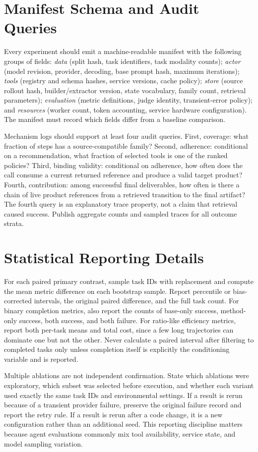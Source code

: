 \documentclass[10pt]{article}
\begin{document}
\section{Manifest Schema and Audit Queries}
Every experiment should emit a machine-readable manifest with the following groups of fields: \emph{data} (split hash, task identifiers, task modality counts); \emph{actor} (model revision, provider, decoding, base prompt hash, maximum iterations); \emph{tools} (registry and schema hashes, service versions, cache policy); \emph{store} (source rollout hash, builder/extractor version, state vocabulary, family count, retrieval parameters); \emph{evaluation} (metric definitions, judge identity, transient-error policy); and \emph{resources} (worker count, token accounting, service hardware configuration). The manifest must record which fields differ from a baseline comparison.

Mechanism logs should support at least four audit queries. First, coverage: what fraction of steps has a source-compatible family? Second, adherence: conditional on a recommendation, what fraction of selected tools is one of the ranked policies? Third, binding validity: conditional on adherence, how often does the call consume a current returned reference and produce a valid target product? Fourth, contribution: among successful final deliverables, how often is there a chain of live product references from a retrieved transition to the final artifact? The fourth query is an explanatory trace property, not a claim that retrieval caused success. Publish aggregate counts and sampled traces for all outcome strata.

\section{Statistical Reporting Details}
For each paired primary contrast, sample task IDs with replacement and compute the mean metric difference on each bootstrap sample. Report percentile or bias-corrected intervals, the original paired difference, and the full task count. For binary completion metrics, also report the counts of base-only success, method-only success, both success, and both failure. For ratio-like efficiency metrics, report both per-task means and total cost, since a few long trajectories can dominate one but not the other. Never calculate a paired interval after filtering to completed tasks only unless completion itself is explicitly the conditioning variable and is reported.

Multiple ablations are not independent confirmation. State which ablations were exploratory, which subset was selected before execution, and whether each variant used exactly the same task IDs and environmental settings. If a result is rerun because of a transient provider failure, preserve the original failure record and report the retry rule. If a result is rerun after a code change, it is a new configuration rather than an additional seed. This reporting discipline matters because agent evaluations commonly mix tool availability, service state, and model sampling variation.
\end{document}
